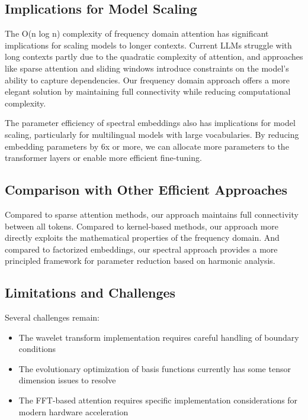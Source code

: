 \documentclass[10pt,twocolumn,letterpaper]{article}
\begin{document}
\subsection{Implications for Model Scaling}

The O(n log n) complexity of frequency domain attention has significant implications for scaling models to longer contexts. Current LLMs struggle with long contexts partly due to the quadratic complexity of attention, and approaches like sparse attention and sliding windows introduce constraints on the model's ability to capture dependencies. Our frequency domain approach offers a more elegant solution by maintaining full connectivity while reducing computational complexity.

The parameter efficiency of spectral embeddings also has implications for model scaling, particularly for multilingual models with large vocabularies. By reducing embedding parameters by 6x or more, we can allocate more parameters to the transformer layers or enable more efficient fine-tuning.

\subsection{Comparison with Other Efficient Approaches}

Compared to sparse attention methods, our approach maintains full connectivity between all tokens. Compared to kernel-based methods, our approach more directly exploits the mathematical properties of the frequency domain. And compared to factorized embeddings, our spectral approach provides a more principled framework for parameter reduction based on harmonic analysis.

\subsection{Limitations and Challenges}

Several challenges remain:

\begin{itemize}
    \item The wavelet transform implementation requires careful handling of boundary conditions
    \item The evolutionary optimization of basis functions currently has some tensor dimension issues to resolve
    \item The FFT-based attention requires specific implementation considerations for modern hardware acceleration
\end{itemize}
\end{document}
